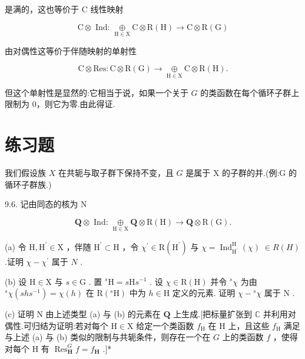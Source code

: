 \documentclass[10pt]{article}
\begin{document}
是满的，这也等价于 C 线性映射

\[
\mathrm{C} \otimes  \text{ Ind: }\underset{\mathrm{H} \in  \mathrm{X}}{ \oplus  }\mathrm{C} \otimes  \mathrm{R}\left( \mathrm{H}\right)  \rightarrow  \mathrm{C} \otimes  \mathrm{R}\left( \mathrm{G}\right)
\]

由对偶性这等价于伴随映射的单射性

\[
\mathrm{C} \otimes  \mathrm{{Res}} : \mathrm{C} \otimes  \mathrm{R}\left( \mathrm{G}\right)  \rightarrow  \underset{\mathrm{H} \in  \mathrm{X}}{ \oplus  }\mathrm{C} \otimes  \mathrm{R}\left( \mathrm{H}\right) .
\]

但这个单射性是显然的:它相当于说，如果一个关于 \(G\) 的类函数在每个循环子群上限制为 0，则它为零.由此得证.

\section*{练习题}

我们假设族 \(X\) 在共轭与取子群下保持不变，且 \(G\) 是属于 X 的子群的并.(例:G 的循环子群族.)

9.6. 记由同态的核为 \(\mathrm{N}\)

\[
\mathbf{Q} \otimes  \text{ Ind: }\underset{\mathrm{H} \in  \mathrm{X}}{ \oplus  }\mathbf{Q} \otimes  \mathrm{R}\left( \mathrm{H}\right)  \rightarrow  \mathbf{Q} \otimes  \mathrm{R}\left( \mathrm{G}\right) .
\]

(a) 令 \(\mathrm{H},{\mathrm{H}}^{\prime } \in  \mathrm{X}\) ，伴随 \({\mathrm{H}}^{\prime } \subset  \mathrm{H}\) ，令 \({\chi }^{\prime } \in  \mathrm{R}\left( {\mathrm{H}}^{\prime }\right)\) 与 \(\chi  = {\operatorname{Ind}}_{{\mathrm{H}}^{\prime }}^{\mathrm{H}}\left( \chi \right) \; \in  R\left( H\right)\) .证明 \(\chi  - {\chi }^{\prime }\) 属于 \(N\) .

(b) 设 \(\mathrm{H} \in  \mathrm{X}\) 与 \(s \in  \mathrm{G}\) . 置 \({}^{s}\mathrm{H} = s\mathrm{H}{s}^{-1}\) . 设 \(\chi  \in  \mathrm{R}\left( \mathrm{H}\right)\) 并令 \({}^{s}\chi\) 为由 \({}^{s}\chi \left( {{sh}{s}^{-1}}\right)  = \chi \left( h\right)\) 在 \(\mathrm{R}\left( {{}^{s}\mathrm{H}}\right)\) 中为 \(h \in  \mathrm{H}\) 定义的元素. 证明 \(\chi  - {}^{s}\chi\) 属于 \(\mathrm{N}\) .

(c) 证明 \(\mathrm{N}\) 由上述类型 (a) 与 (b) 的元素在 \(\mathbf{Q}\) 上生成.[把标量扩张到 \(\mathbb{C}\) 并利用对偶性.可归结为证明:若对每个 \(\mathrm{H} \in  \mathrm{X}\) 给定一个类函数 \({f}_{\mathrm{H}}\) 在 \(\mathrm{H}\) 上，且这些 \({f}_{\mathrm{H}}\) 满足与上述 (a) 与 (b) 类似的限制与共轭条件，则存在一个在 \(G\) 上的类函数 \(f\) ，使得对每个 H 有 \({\operatorname{Res}}_{\mathbf{H}}^{G}f = {f}_{\mathbf{H}}\) .]*
\end{document}
